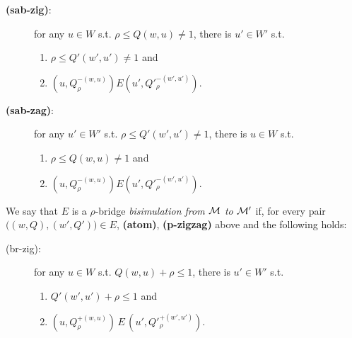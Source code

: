 \begin{definition}[Bisimulation]
\begin{description}
\item [\textbf{(sab-zig)}:] for any $u\in W$ s.t. $\rho\le Q(w,u)\neq 1$, there is $u'\in W'$ s.t.    
\begin{enumerate}
    \item $\rho\le Q'(w',u')\neq 1$ and 
    \item $(u,Q_\rho^{-(w,u)})E(u',Q'^{-(w',u')}_\rho)$.  
\end{enumerate}
\item [\textbf{(sab-zag)}:] for any $u'\in W'$ s.t. $\rho\le Q'(w',u')\neq 1$, there is $u\in W$ s.t.    
\begin{enumerate}
    \item $\rho\le Q(w,u)\neq 1$ and 
    \item $(u,Q_\rho^{-(w,u)})E(u',Q'^{-(w',u')}_\rho)$.  
\end{enumerate}
%
\end{description}

We say that $E$ is a $\rho$-bridge \emph{bisimulation from $\mathcal{M}$ to $\mathcal{M}'$} if, for every pair $\big((w,Q) ,(w',Q')\big)\in E$, \textbf{(atom)}, \textbf{(p-zigzag)} above and the following holds:

\begin{description}
    \item[(br-zig):]  for any $u\in W$ s.t. $Q(w,u)+\rho\le 1$, there is $u'\in W'$ s.t.
        \begin{enumerate}
            \item $Q'(w',u')+\rho\le 1$ and 
            \item $(u,Q_\rho^{+(w,u)})\,E\,(u',Q'^{+(w',u')}_\rho)$.
        \end{enumerate}
    

\end{description}
\end{definition}
